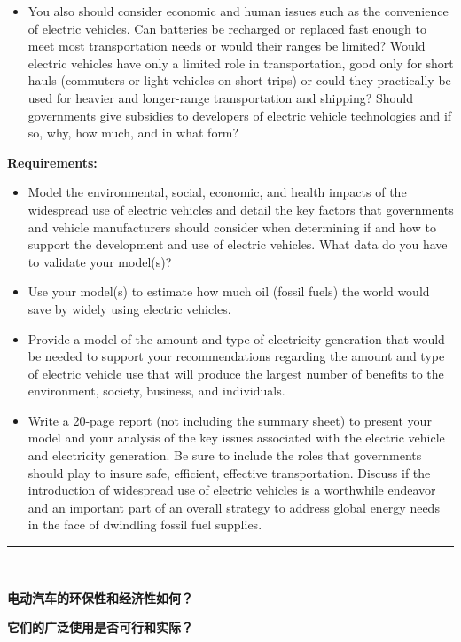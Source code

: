 \documentclass[bwprint]{cumcmthesis}
\begin{document}
\begin{shaded}
{\begin{itemize}
\item You also should consider economic and human issues such as the convenience of electric vehicles. Can batteries be recharged or replaced fast enough to meet most transportation needs or would their ranges be limited? Would electric vehicles have only a limited role in transportation, good only for short hauls (commuters or light vehicles on short trips) or could they practically be used for heavier and longer-range transportation and shipping? Should governments give subsidies to developers of electric vehicle technologies and if so, why, how much, and in what form?
\end{itemize}

\noindent\textbf{Requirements:}
\begin{itemize}
\item Model the environmental, social, economic, and health impacts of the widespread use of electric vehicles and detail the key factors that governments and vehicle manufacturers should consider when determining if and how to support the development and use of electric vehicles. What data do you have to validate your model(s)?
\item Use your model(s) to estimate how much oil (fossil fuels) the world would save by widely using electric vehicles.
\item Provide a model of the amount and type of electricity generation that would be needed to support your recommendations regarding the amount and type of electric vehicle use that will produce the largest number of benefits to the environment, society, business, and individuals.
\item Write a 20-page report (not including the summary sheet) to present your model and your analysis of the key issues associated with the electric vehicle and electricity generation. Be sure to include the roles that governments should play to insure safe, efficient, effective transportation. Discuss if the introduction of widespread use of electric vehicles is a worthwhile endeavor and an important part of an overall strategy to address global energy needs in the face of dwindling fossil fuel supplies.

\end{itemize}

\noindent\rule{\textwidth}{0.1mm}
\normalsize\ 

\noindent\textbf{电动汽车的环保性和经济性如何？}

\noindent\textbf{它们的广泛使用是否可行和实际？}

}
\end{shaded}
\end{document}

